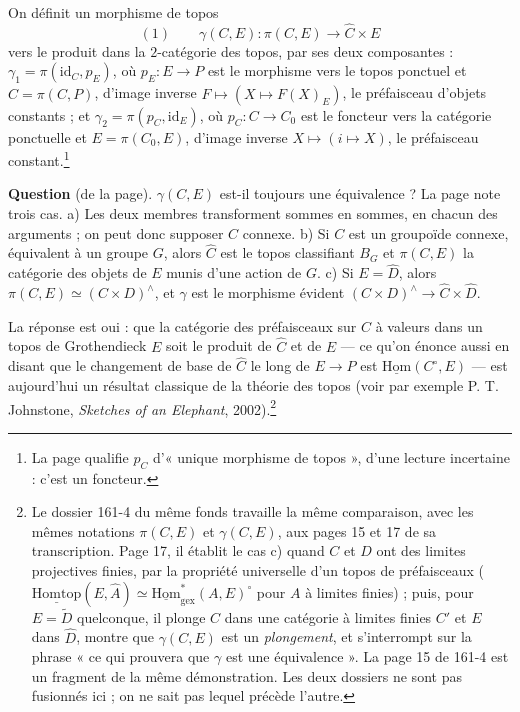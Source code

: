 \documentclass[11pt,a4paper]{article}
\begin{document}
On définit un morphisme de topos
\[
(1)\qquad \gamma(C, E) : \pi(C, E) \longrightarrow \hat{C} \times E
\]
vers le produit dans la $2$-catégorie des topos, par ses deux composantes :
$\gamma_1 = \pi(\mathrm{id}_C, p_E)$, où $p_E : E \to P$ est le morphisme vers
le topos ponctuel et $\hat{C} = \pi(C, P)$, d'image inverse
$F \mapsto (X \mapsto F(X)_E)$, le préfaisceau d'objets constants ; et
$\gamma_2 = \pi(p_C, \mathrm{id}_E)$, où $p_C : C \to C_0$ est le foncteur vers
la catégorie ponctuelle et $E = \pi(C_0, E)$, d'image inverse
$X \mapsto (i \mapsto X)$, le préfaisceau constant.\footnote{La page qualifie
$p_C$ d'« unique morphisme de topos », d'une lecture incertaine : c'est un
foncteur.}

\textbf{Question} (de la page). $\gamma(C, E)$ est-il toujours une
équivalence ? La page note trois cas. a) Les deux membres transforment
sommes en sommes, en chacun des arguments ; on peut donc supposer $C$
connexe. b) Si $C$ est un groupoïde connexe, équivalent à un groupe $G$,
alors $\hat{C}$ est le topos classifiant $B_G$ et $\pi(C, E)$ la catégorie
des objets de $E$ munis d'une action de $G$. c) Si $E = \hat{D}$, alors
$\pi(C, E) \simeq (C \times D)^{\wedge}$, et $\gamma$ est le morphisme évident
$(C \times D)^{\wedge} \to \hat{C} \times \hat{D}$.

La réponse est oui : que la catégorie des préfaisceaux sur $C$ à valeurs dans
un topos de Grothendieck $E$ soit le produit de $\hat{C}$ et de $E$ --- ce
qu'on énonce aussi en disant que le changement de base de $\hat{C}$ le long
de $E \to P$ est $\underline{\mathrm{Hom}}(C^{\circ}, E)$ --- est aujourd'hui
un résultat classique de la théorie des topos (voir par exemple
P. T. Johnstone, \emph{Sketches of an Elephant}, 2002).\footnote{Le dossier
161-4 du même fonds travaille la même comparaison, avec les mêmes notations
$\pi(C, E)$ et $\gamma(C, E)$, aux pages 15 et 17 de sa transcription.
Page 17, il établit le cas c) quand $C$ et $D$ ont des limites projectives
finies, par la propriété universelle d'un topos de préfaisceaux
($\underline{\mathrm{Homtop}}(E, \hat{A}) \simeq \underline{\mathrm{Hom}}^{*}_{\mathrm{gex}}(A, E)^{\circ}$
pour $A$ à limites finies) ; puis, pour $E = \widetilde{D}$ quelconque, il
plonge $C$ dans une catégorie à limites finies $C'$ et $E$ dans $\hat{D}$,
montre que $\gamma(C, E)$ est un \emph{plongement}, et s'interrompt sur la
phrase « ce qui prouvera que $\gamma$ est une équivalence ». La page 15 de
161-4 est un fragment de la même démonstration. Les deux dossiers ne sont pas
fusionnés ici ; on ne sait pas lequel précède l'autre.}
\end{document}
